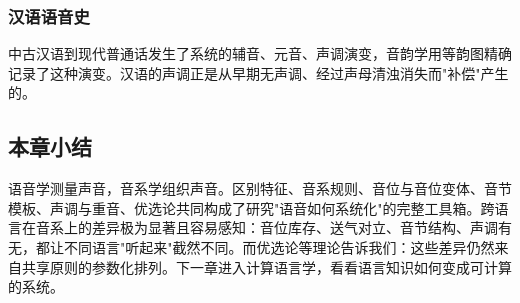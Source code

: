 \subsubsection{汉语语音史}

中古汉语到现代普通话发生了系统的辅音、元音、声调演变，音韵学用等韵图精确记录了这种演变。汉语的声调正是从早期无声调、经过声母清浊消失而"补偿"产生的。

\subsection{本章小结}

语音学测量声音，音系学组织声音。区别特征、音系规则、音位与音位变体、音节模板、声调与重音、优选论共同构成了研究"语音如何系统化"的完整工具箱。跨语言在音系上的差异极为显著且容易感知：音位库存、送气对立、音节结构、声调有无，都让不同语言"听起来"截然不同。而优选论等理论告诉我们：这些差异仍然来自共享原则的参数化排列。下一章进入计算语言学，看看语言知识如何变成可计算的系统。
